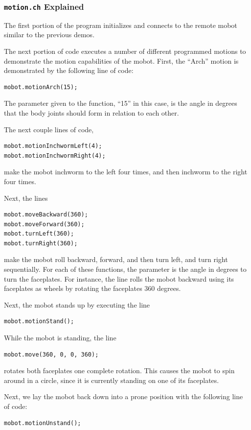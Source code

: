 \documentclass{article}
\begin{document}
\subsubsection{\texttt{motion.ch} Explained}
The first portion of the program initializes and connects to the
remote mobot similar to the previous demos.

The next portion of code executes a number of different programmed motions
to demonstrate the motion capabilities of the mobot. First, the ``Arch'' motion
is demonstrated by the following line of code:
\begin{verbatim}
mobot.motionArch(15);
\end{verbatim}
The parameter given to the function, ``15'' in this case, is the angle in degrees 
that the body joints should form in relation to each other. 

The next couple lines of code,
\begin{verbatim}
mobot.motionInchwormLeft(4);
mobot.motionInchwormRight(4);
\end{verbatim}
make the mobot inchworm to the left four times, and then inchworm to the right
four times. 

Next, the lines
\begin{verbatim}
mobot.moveBackward(360);
mobot.moveForward(360);
mobot.turnLeft(360);
mobot.turnRight(360);
\end{verbatim}
make the mobot roll backward, forward, and then turn left, and turn right
sequentially. For each of these functions, the parameter is the angle in degrees
to turn the faceplates. For instance, the line rolls the mobot backward
using its faceplates as wheels by rotating the faceplates 360 degrees.

Next, the mobot stands up by executing the line
\begin{verbatim}
mobot.motionStand();
\end{verbatim}

While the mobot is standing, the line
\begin{verbatim}
mobot.move(360, 0, 0, 360);
\end{verbatim}
rotates both faceplates one complete rotation. This causes the mobot to spin around 
in a circle, since it is currently standing on one of its faceplates.

Next, we lay the mobot back down into a prone position with the following line
of code:
\begin{verbatim}
mobot.motionUnstand();
\end{verbatim}
\end{document}
